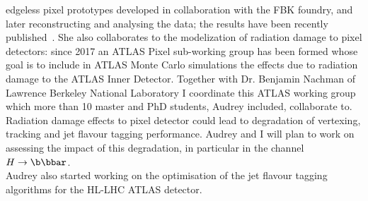 edgeless pixel prototypes developed in collaboration with the FBK foundry, and later reconstructing 
and analysing the data; the results have been recently published~\cite{1748-0221-12-05-P05006}.
She also collaborates to the modelization of radiation damage to pixel detectors: since 2017 
an ATLAS Pixel sub-working group has been formed whose goal is to include in ATLAS Monte Carlo 
simulations the effects due to radiation damage to the ATLAS Inner Detector. Together 
with Dr. Benjamin Nachman of Lawrence Berkeley National Laboratory I coordinate this 
ATLAS working group  which more than 10 master and PhD students, Audrey included, collaborate to.
\\
Radiation damage effects to pixel detector could lead to degradation of vertexing, tracking 
and jet flavour tagging performance. Audrey and I will plan to work on assessing the impact of this 
degradation, in particular in the channel $H\to\b\bbar$. 
\\Audrey also started working on the optimisation of the jet flavour tagging algorithms for the
HL-LHC  ATLAS detector. 
